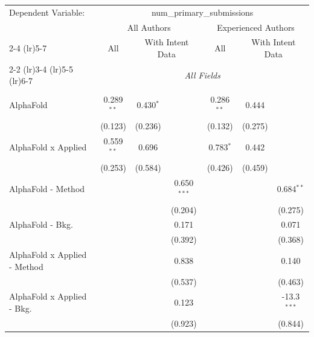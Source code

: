 \begingroup
\centering
\begin{tabular}{lcccccc}
   \tabularnewline \midrule \midrule
   Dependent Variable: & \multicolumn{6}{c}{num\_primary\_submissions}\\
 & \multicolumn{3}{c}{All Authors} & \multicolumn{3}{c}{Experienced Authors} \\
\cmidrule(lr){2-4} \cmidrule(lr){5-7}
 & \multicolumn{1}{c}{All} & \multicolumn{2}{c}{With Intent Data} & \multicolumn{1}{c}{All} & \multicolumn{2}{c}{With Intent Data} \\
\cmidrule(lr){2-2} \cmidrule(lr){3-4} \cmidrule(lr){5-5} \cmidrule(lr){6-7}
 & \multicolumn{6}{c}{\textit{All Fields}} \\ \\
   AlphaFold                      & 0.289$^{**}$  & 0.430$^{*}$    &                & 0.286$^{**}$ & 0.444   &   \\   
                                  & (0.123)       & (0.236)        &                & (0.132)      & (0.275) &   \\   
   AlphaFold x Applied            & 0.559$^{**}$  & 0.696          &                & 0.783$^{*}$  & 0.442   &   \\   
                                  & (0.253)       & (0.584)        &                & (0.426)      & (0.459) &   \\   
   AlphaFold - Method             &               &                & 0.650$^{***}$  &              &         & 0.684$^{**}$\\   
                                  &               &                & (0.204)        &              &         & (0.275)\\   
   AlphaFold - Bkg.               &               &                & 0.171          &              &         & 0.071\\   
                                  &               &                & (0.392)        &              &         & (0.368)\\   
   AlphaFold x Applied - Method   &               &                & 0.838          &              &         & 0.140\\   
                                  &               &                & (0.537)        &              &         & (0.463)\\   
   AlphaFold x Applied - Bkg.     &               &                & 0.123          &              &         & -13.3$^{***}$\\   
                                  &               &                & (0.923)        &              &         & (0.844)\\   

\end{tabular}
